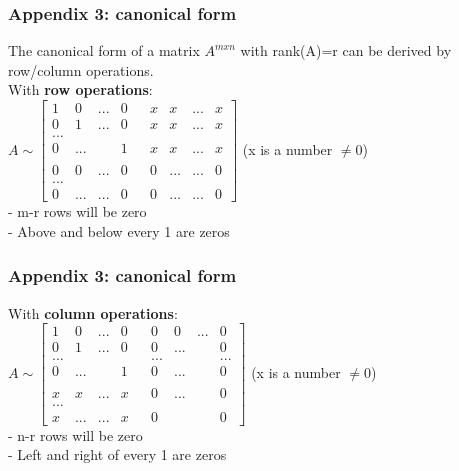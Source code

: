\begin{frame}
	\frametitle{Appendix 3: canonical form}
	The canonical form of a matrix $A^{mxn}$ with rank(A)=r can be derived by row/column operations. \\
	With \textbf{row operations}:\\
	$A \sim \begin{bmatrix}
	1 & 0 & ... & 0 &  & x & x & ... & x\\
	0 & 1 & ... & 0 &  & x & x & ... & x\\
	...\\
	0 & ... & & 1 & & x& x& ...& x\\
	 \\
	 0 & 0 & ... & 0 & & 0 & ... &... & 0\\
	...\\
	0 & ... & ... & 0 & & 0 & ... &... & 0
	\end{bmatrix}$ (x is a number $\neq$0)\\
	- m-r rows will be zero \\
	- Above and below every 1 are zeros
\end{frame}

\begin{frame}
	\frametitle{Appendix 3: canonical form}
	With \textbf{column operations}:\\
	$A \sim \begin{bmatrix}
	1 & 0 & ... & 0 &  & 0 & 0 & ... & 0\\
	0 & 1 & ... & 0 &  & 0 & ...  &  & 0 \\
	... & & & & & ... & & & ...\\
	0 & ... & & 1 & & 0 & ... & & 0\\
	\\
	x & x & ... & x & & 0 & ... & & 0\\
	...\\
	x & ... & ... & x & & 0 & & & 0
	\end{bmatrix}$ (x is a number $\neq$0)\\
	- n-r rows will be zero \\
	- Left and right of every 1 are zeros
\end{frame}